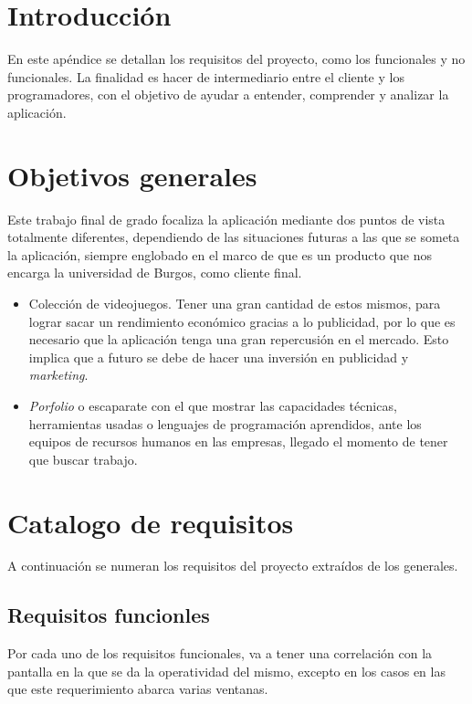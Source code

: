 
\section{Introducción}\label{requisitos}
En este apéndice se detallan los requisitos del proyecto, como los funcionales y no funcionales. La finalidad es hacer de intermediario entre el cliente y los programadores, con el objetivo de ayudar a entender, comprender y analizar la aplicación. 

\section{Objetivos generales}
Este trabajo final de grado focaliza la aplicación mediante dos puntos de vista totalmente diferentes, dependiendo de las situaciones futuras a las que se someta la aplicación, siempre englobado en el marco de que es un producto que nos encarga la universidad de Burgos, como cliente final.

\begin{itemize}
	\item Colección de videojuegos. Tener una gran cantidad de estos mismos, para lograr sacar un rendimiento económico gracias a lo publicidad, por lo que es necesario que la aplicación tenga una gran repercusión en el mercado. Esto implica que a futuro se debe de hacer una inversión en publicidad y \emph{marketing}.
	\item \emph{Porfolio} \cite{wiki:portafolio} o escaparate con el que mostrar las capacidades técnicas, herramientas usadas o lenguajes de programación aprendidos, ante los equipos de recursos humanos en las empresas, llegado el momento de tener que buscar trabajo. 
\end{itemize}

\section{Catalogo de requisitos}
A continuación se numeran los requisitos del proyecto extraídos de los generales.

\subsection{Requisitos funcionles}
Por cada uno de los requisitos funcionales, va a tener una correlación con la pantalla en la que se da la operatividad del mismo, excepto en los casos en las que este requerimiento abarca varias ventanas.

